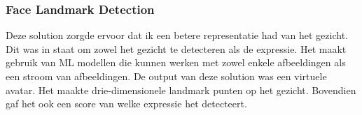 \subsubsection{Face Landmark Detection}
Deze solution zorgde ervoor dat ik een betere representatie had van het gezicht. Dit was in staat om zowel het gezicht te detecteren als de expressie. Het maakt gebruik van ML modellen die kunnen werken met zowel enkele afbeeldingen als een stroom van afbeeldingen. De output van deze solution was een virtuele avatar. Het maakte drie-dimensionele landmark punten op het gezicht. Bovendien gaf het ook een score van welke expressie het detecteert. 